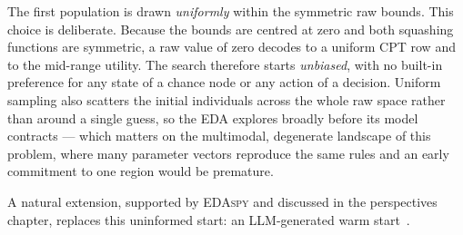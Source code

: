 The first population is drawn \emph{uniformly} within the symmetric raw
bounds. This choice is deliberate. Because the bounds are centred at
zero and both squashing functions are symmetric, a raw value of
zero decodes to a uniform CPT row and to the mid-range utility. The
search therefore starts \emph{unbiased}, with no built-in preference for
any state of a chance node or any action of a decision. Uniform sampling
also scatters the initial individuals across the whole raw space rather
than around a single guess, so the EDA explores broadly before its model
contracts — which matters on the multimodal, degenerate landscape of
this problem, where many parameter vectors reproduce the same rules and
an early commitment to one region would be premature.

A natural extension, supported by \textsc{EDAspy} and discussed
in the perspectives chapter, replaces this uninformed start: an
LLM-generated warm start~\cite{nafar2025llm4bn}.



